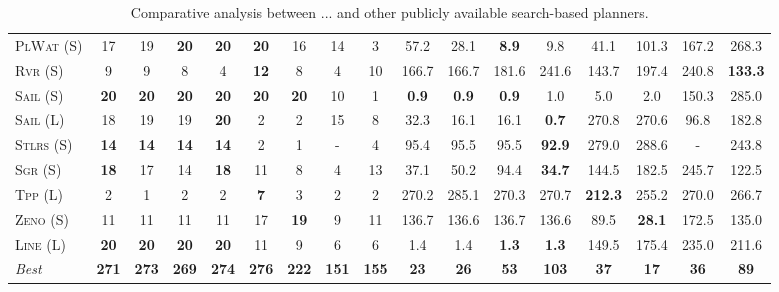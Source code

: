 \begin{table}[tb]
{\begin{tabular}{|l||cccccccc||cccccccc||}
\textsc{PlWat} (S)&17&19&\textbf{20}&\textbf{20}&\textbf{20}&16&14&3&57.2&28.1&\textbf{8.9}&9.8&41.1&101.3&167.2&268.3\\
\textsc{Rvr} (S)&9&9&8&4&\textbf{12}&8&4&10&166.7&166.7&181.6&241.6&143.7&197.4&240.8&\textbf{133.3}\\
\textsc{Sail} (S)&\textbf{20}&\textbf{20}&\textbf{20}&\textbf{20}&\textbf{20}&\textbf{20}&10&1&\textbf{0.9}&\textbf{0.9}&\textbf{0.9}&1.0&5.0&2.0&150.3&285.0\\
\textsc{Sail} (L)&18&19&19&\textbf{20}&2&2&15&8&32.3&16.1&16.1&\textbf{0.7}&270.8&270.6&96.8&182.8\\
\textsc{Stlrs} (S)&\textbf{14}&\textbf{14}&\textbf{14}&\textbf{14}&2&1&-&4&95.4&95.5&95.5&\textbf{92.9}&279.0&288.6&-&243.8\\
\textsc{Sgr} (S)&\textbf{18}&17&14&\textbf{18}&11&8&4&13&37.1&50.2&94.4&\textbf{34.7}&144.5&182.5&245.7&122.5\\
\textsc{Tpp} (L)&2&1&2&2&\textbf{7}&3&2&2&270.2&285.1&270.3&270.7&\textbf{212.3}&255.2&270.0&266.7\\
\textsc{Zeno} (S)&11&11&11&11&17&\textbf{19}&9&11&136.7&136.6&136.7&136.6&89.5&\textbf{28.1}&172.5&135.0\\
\textsc{Line} (L)&\textbf{20}&\textbf{20}&\textbf{20}&\textbf{20}&11&9&6&6&1.4&1.4&\textbf{1.3}&\textbf{1.3}&149.5&175.4&235.0&211.6
\\\hline
\textit{Best}&\textbf{271}&\textbf{273}&\textbf{269}&\textbf{274}&\textbf{276}&\textbf{222}&\textbf{151}&\textbf{155}&\textbf{23}&\textbf{26}&\textbf{53}&\textbf{103}&\textbf{37}&\textbf{17}&\textbf{36}&\textbf{89}\\\hline

        \end{tabular}}
        \caption{Comparative analysis between ... and other publicly available search-based planners.}
        \label{tab:search}
        \end{table}
        